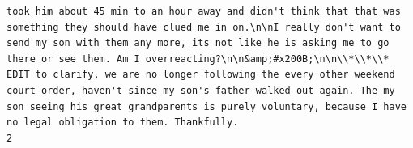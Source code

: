 \documentclass[
  letterpaper,
  DIV=11,
  numbers=noendperiod]{scrreprt}
\begin{document}
\begin{verbatim}
took him about 45 min to an hour away and didn't think that that was something they should have clued me in on.\n\nI really don't want to send my son with them any more, its not like he is asking me to go there or see them. Am I overreacting?\n\n&amp;#x200B;\n\n\\*\\*\\* EDIT to clarify, we are no longer following the every other weekend court order, haven't since my son's father walked out again. The my son seeing his great grandparents is purely voluntary, because I have no legal obligation to them. Thankfully.
2                                                                                                                                                                                                                                                                                                                                                                                                                                                                                                                                                                                                                                                                                                                                                                                                                                                                                                                                                                                                                                                                                                                                                                                                                                                                                                                                                                                                                                                                                                                                                                                                                                                                                                                                                                                                                                                                                                                                                                                                                                                                                                                                                                                                                                                                                                                                                                                                                                                                                                                                                                                                                                                                                                                                                                               
\end{verbatim}
\end{document}
